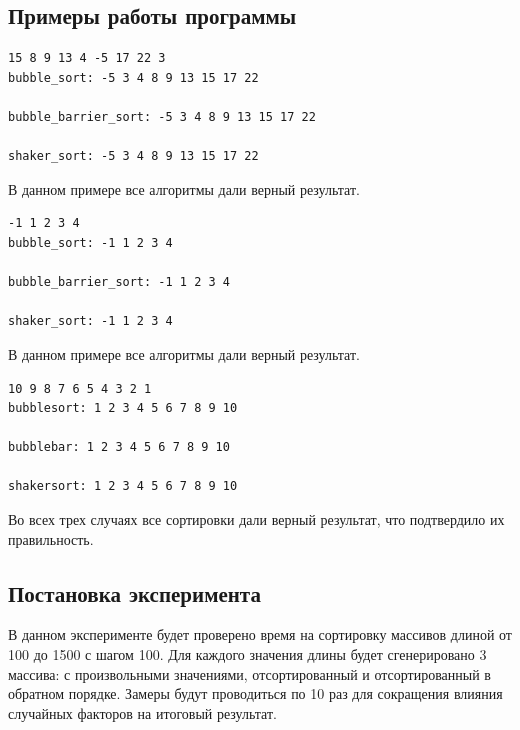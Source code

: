 \documentclass[a4paper, 14pt]{article}
\begin{document}
        \subsection{Примеры работы программы}
		\begin{lstlisting}[label=some-code,caption=Пример работы 1]        
15 8 9 13 4 -5 17 22 3 
bubble_sort: -5 3 4 8 9 13 15 17 22 

bubble_barrier_sort: -5 3 4 8 9 13 15 17 22 

shaker_sort: -5 3 4 8 9 13 15 17 22 

		\end{lstlisting}
		В данном примере все алгоритмы дали верный результат.
		\begin{lstlisting}[label=some-code,caption=Пример работы 2]		
-1 1 2 3 4 
bubble_sort: -1 1 2 3 4 

bubble_barrier_sort: -1 1 2 3 4 

shaker_sort: -1 1 2 3 4 

		\end{lstlisting}
		В данном примере все алгоритмы дали верный результат.
		\begin{lstlisting}[label=some-code,caption=Пример работы 3]		
10 9 8 7 6 5 4 3 2 1 
bubblesort: 1 2 3 4 5 6 7 8 9 10 

bubblebar: 1 2 3 4 5 6 7 8 9 10 

shakersort: 1 2 3 4 5 6 7 8 9 10 
		\end{lstlisting}
		Во всех трех случаях все сортировки дали верный результат, что подтвердило их правильность.
		
		\subsection{Постановка эксперимента}
		\parindent=1cm
		В данном эксперименте будет проверено время на сортировку массивов длиной от 100 до 1500 с шагом 100. Для каждого значения длины будет сгенерировано 3 массива: с произвольными значениями, отсортированный и отсортированный в обратном порядке. Замеры будут проводиться по 10 раз для сокращения влияния случайных факторов на итоговый результат. 
\end{document}
